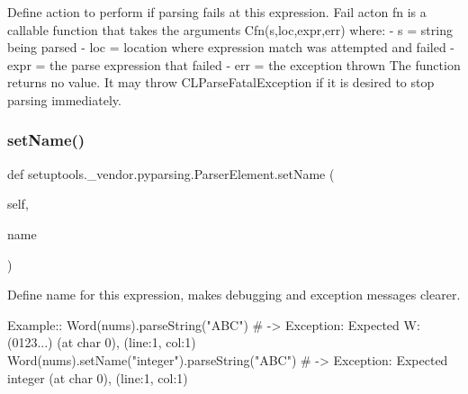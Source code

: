 \begin{DoxyVerb}Define action to perform if parsing fails at this expression.
   Fail acton fn is a callable function that takes the arguments
   C{fn(s,loc,expr,err)} where:
    - s = string being parsed
    - loc = location where expression match was attempted and failed
    - expr = the parse expression that failed
    - err = the exception thrown
   The function returns no value.  It may throw C{L{ParseFatalException}}
   if it is desired to stop parsing immediately.\end{DoxyVerb}
 \mbox{\label{classsetuptools_1_1__vendor_1_1pyparsing_1_1ParserElement_ab346e0dc4858607df91e45997f921727}} 
\subsubsection{\texorpdfstring{set\+Name()}{setName()}}
{\footnotesize\ttfamily def setuptools.\+\_\+vendor.\+pyparsing.\+Parser\+Element.\+set\+Name (\begin{DoxyParamCaption}\item[{}]{self,  }\item[{}]{name }\end{DoxyParamCaption})}

\begin{DoxyVerb}Define name for this expression, makes debugging and exception messages clearer.

Example::
    Word(nums).parseString("ABC")  # -> Exception: Expected W:(0123...) (at char 0), (line:1, col:1)
    Word(nums).setName("integer").parseString("ABC")  # -> Exception: Expected integer (at char 0), (line:1, col:1)
\end{DoxyVerb}
 \mbox{\label{classsetuptools_1_1__vendor_1_1pyparsing_1_1ParserElement_aeb240cc333ab3c73d5955f00b2dbf1e4}} 
